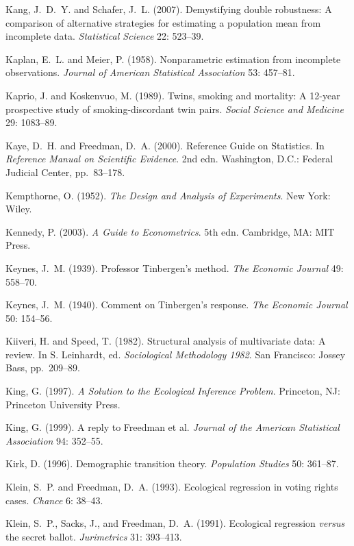 \smallskip\noindent
Kang, J.~D.~Y. and Schafer, J.~L. (2007).
Demystifying double robustness: A comparison of alternative strategies
for estimating a population mean from incomplete data.
{\it Statistical Science\/} 22: 523--39.

\smallskip\noindent
Kaplan, E.~L. and Meier, P. (1958).
Nonparametric estimation from incomplete observations.
{\it Journal of American Statistical Association\/} 53: 457--81.

\smallskip\noindent
Kaprio, J. and Koskenvuo, M. (1989).
Twins, smoking and mortality: A 12-year prospective study of smoking-discordant twin pairs.
{\it Social Science and Medicine} 29: 1083--89.

\smallskip\noindent
Kaye, D.~H. and Freedman, D.~A. (2000).
Reference Guide on Statistics.
In {\it Reference Manual on Scientific Evidence\/}. 2nd edn.
Washington, D.C.: Federal Judicial Center, pp.~83--178.

\smallskip\noindent
Kempthorne, O. (1952).
{\it The Design and Analysis of Experiments\/}.
New York: Wiley.

\smallskip\noindent
Kennedy, P. (2003).
{\it A Guide to Econometrics\/}. 5th edn.
Cambridge, MA: MIT Press.

\smallskip\noindent
Keynes, J.~M. (1939).
Professor Tinbergen's method.
{\it The Economic Journal\/} 49: 558--70.

\smallskip\noindent
Keynes, J.~M. (1940).
Comment on Tinbergen's response.
{\it The Economic Journal\/} 50: 154--56.

\smallskip\noindent
Kiiveri, H. and Speed, T. (1982).
Structural analysis of multivariate data: A review.
In S. Leinhardt, ed. {\it Sociological Methodology 1982\/}.
San Francisco: Jossey Bass, pp.~209--89.

\smallskip\noindent
King, G. (1997).
{\it A Solution to the Ecological Inference Problem\/}.
Princeton, NJ: Princeton University Press.

\smallskip\noindent
King, G. (1999).
A reply to Freedman et al.
{\it Journal of the American Statistical Association\/} 94: 352--55.

\smallskip\noindent
Kirk, D. (1996).
Demographic transition theory.
{\it Population Studies\/} 50: 361--87.

\smallskip\noindent
Klein, S.~P. and Freedman, D.~A. (1993).
Ecological regression in voting rights cases.
{\it Chance\/} 6: 38--43.

\smallskip\noindent
Klein, S.~P., Sacks, J., and Freedman, D.~A. (1991).
Ecological regression {\it versus} the secret ballot.
{\it Jurimetrics\/} 31: 393--413.

